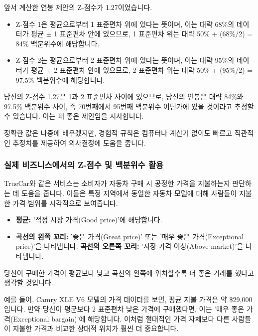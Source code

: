 \documentclass[11pt,a4paper]{article}
\theoremstyle{definition}
\begin{document}
\begin{examplebox}[title=경험적 규칙 적용: Z-점수 1.27]
앞서 계산한 연봉 제안의 Z-점수가 1.27이었습니다.
\begin{itemize}
    \item Z-점수 1은 평균으로부터 1 표준편차 위에 있다는 뜻이며, 이는 대략 68\%의 데이터가 평균 \(\pm\) 1 표준편차 안에 있으므로, 1 표준편차 위는 대략 50\% + (68\%/2) = 84\% 백분위수에 해당합니다.
    \item Z-점수 2는 평균으로부터 2 표준편차 위에 있다는 뜻이며, 이는 대략 95\%의 데이터가 평균 \(\pm\) 2 표준편차 안에 있으므로, 2 표준편차 위는 대략 50\% + (95\%/2) = 97.5\% 백분위수에 해당합니다.
\end{itemize}
당신의 Z-점수 1.27은 1과 2 표준편차 사이에 있으므로, 당신의 연봉은 대략 84\%와 97.5\% 백분위수 사이, 즉 70번째에서 95번째 백분위수 어딘가에 있을 것이라고 추정할 수 있습니다. 이는 꽤 좋은 제안임을 시사합니다.

정확한 값은 나중에 배우겠지만, 경험적 규칙은 컴퓨터나 계산기 없이도 빠르고 직관적인 추정치를 제공하여 의사결정에 도움을 줍니다.
\end{examplebox}

\subsubsection*{실제 비즈니스에서의 Z-점수 및 백분위수 활용}

\begin{examplebox}[title=자동차 가격 비교 (TrueCar)]
TrueCar와 같은 서비스는 소비자가 자동차 구매 시 공정한 가격을 지불하는지 판단하는 데 도움을 줍니다. 이들은 특정 지역에서 동일한 자동차 모델에 대해 사람들이 지불한 가격 범위를 시각적으로 보여줍니다.
\begin{itemize}
    \item \textbf{평균:} '적정 시장 가격(Good price)'에 해당합니다.
    \item \textbf{곡선의 왼쪽 꼬리:} '좋은 가격(Great price)' 또는 '매우 좋은 가격(Exceptional price)'을 나타냅니다.
    \textbf{곡선의 오른쪽 꼬리:} '시장 가격 이상(Above market)'을 나타냅니다.
\end{itemize}
당신이 구매한 가격이 평균보다 낮고 곡선의 왼쪽에 위치할수록 더 좋은 거래를 했다고 생각할 것입니다.

예를 들어, Camry XLE V6 모델의 가격 데이터를 보면, 평균 지불 가격은 약 \$29,000입니다. 만약 당신이 평균보다 2 표준편차 낮은 가격에 구매했다면, 이는 '매우 좋은 가격(Exceptional bargain)'에 해당합니다. 이처럼 절대적인 가격 자체보다 다른 사람들이 지불한 가격과 비교한 상대적 위치가 훨씬 더 중요합니다.
\end{examplebox}
\end{document}
